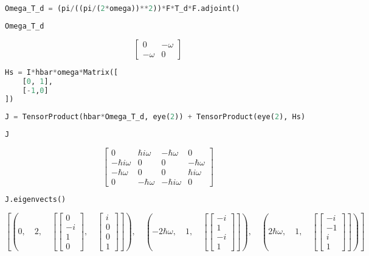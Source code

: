 \begin{lstlisting}[language=Python]
Omega_T_d = (pi/((pi/(2*omega))**2))*F*T_d*F.adjoint()
\end{lstlisting}

\begin{lstlisting}[language=Python]
Omega_T_d
\end{lstlisting}

\[\left[\begin{matrix}0 & - \omega\\- \omega & 0\end{matrix}\right]\]

\begin{lstlisting}[language=Python]
Hs = I*hbar*omega*Matrix([
    [0, 1],
    [-1,0]
])
\end{lstlisting}

\begin{lstlisting}[language=Python]
J = TensorProduct(hbar*Omega_T_d, eye(2)) + TensorProduct(eye(2), Hs)
\end{lstlisting}

\begin{lstlisting}[language=Python]
J
\end{lstlisting}

\[\left[\begin{matrix}0 & \hbar i \omega & - \hbar \omega & 0\\- \hbar i \omega & 0 & 0 & - \hbar \omega\\- \hbar \omega & 0 & 0 & \hbar i \omega\\0 & - \hbar \omega & - \hbar i \omega & 0\end{matrix}\right]\]

\begin{lstlisting}[language=Python]
J.eigenvects()
\end{lstlisting}

\[\left [ \left ( 0, \quad 2, \quad \left [ \left[\begin{matrix}0\\- i\\1\\0\end{matrix}\right], \quad \left[\begin{matrix}i\\0\\0\\1\end{matrix}\right]\right ]\right ), \quad \left ( - 2 \hbar \omega, \quad 1, \quad \left [ \left[\begin{matrix}- i\\1\\- i\\1\end{matrix}\right]\right ]\right ), \quad \left ( 2 \hbar \omega, \quad 1, \quad \left [ \left[\begin{matrix}- i\\-1\\i\\1\end{matrix}\right]\right ]\right )\right ]\]
